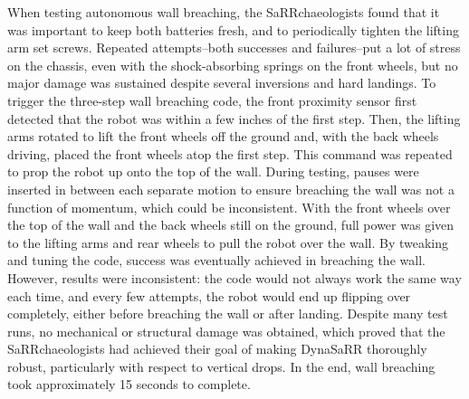 When testing autonomous wall breaching, the SaRRchaeologists found that it was important to keep both batteries fresh, and to periodically tighten the lifting arm set screws. Repeated attempts--both successes and failures--put a lot of stress on the chassis, even with the shock-absorbing springs on the front wheels, but no major damage was sustained despite several inversions and hard landings. To trigger the three-step wall breaching code, the front proximity sensor first detected that the robot was within a few inches of the first step. Then, the lifting arms rotated to lift the front wheels off the ground and, with the back wheels driving, placed the front wheels atop the first step. This command was repeated to prop the robot up onto the top of the wall. During testing, pauses were inserted in between each separate motion to ensure breaching the wall was not a function of momentum, which could be inconsistent. With the front wheels over the top of the wall and the back wheels still on the ground, full power was given to the lifting arms and rear wheels to pull the robot over the wall. By tweaking and tuning the code, success was eventually achieved in breaching the wall. However, results were inconsistent: the code would not always work the same way each time, and every few attempts, the robot would end up flipping over completely, either before breaching the wall or after landing. Despite many test runs, no mechanical or structural damage was obtained, which proved that the SaRRchaeologists had achieved their goal of making DynaSaRR thoroughly robust, particularly with respect to vertical drops. In the end, wall breaching took approximately 15 seconds to complete.

